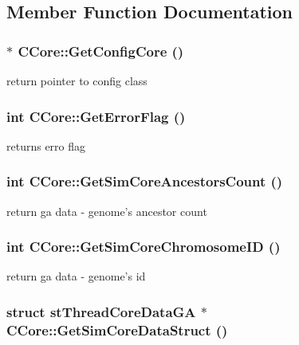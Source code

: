 \subsection{Member Function Documentation}
\hypertarget{classCCore_a08ea111ccd738ddbc2d29ec3c9ac3443}{
\subsubsection[{GetConfigCore}]{ $\ast$ CCore::GetConfigCore ()}}
\label{classCCore_a08ea111ccd738ddbc2d29ec3c9ac3443}
return pointer to config class \hypertarget{classCCore_a86ddf9496601836d1dae7432279fd044}{
\subsubsection[{GetErrorFlag}]{\setlength{\rightskip}{0pt plus 5cm}int CCore::GetErrorFlag ()}}
\label{classCCore_a86ddf9496601836d1dae7432279fd044}
returns erro flag \hypertarget{classCCore_ab1b7b2beb189d420eac4f2af40d883c2}{
\subsubsection[{GetSimCoreAncestorsCount}]{\setlength{\rightskip}{0pt plus 5cm}int CCore::GetSimCoreAncestorsCount ()}}
\label{classCCore_ab1b7b2beb189d420eac4f2af40d883c2}
return ga data -\/ genome's ancestor count \hypertarget{classCCore_acad2cd2c8de535f03515281b58c643a6}{
\subsubsection[{GetSimCoreChromosomeID}]{\setlength{\rightskip}{0pt plus 5cm}int CCore::GetSimCoreChromosomeID ()}}
\label{classCCore_acad2cd2c8de535f03515281b58c643a6}
return ga data -\/ genome's id \hypertarget{classCCore_a4ddbbc5f50ff19b2d2b9095792b648a6}{
\subsubsection[{GetSimCoreDataStruct}]{\setlength{\rightskip}{0pt plus 5cm}struct {\bf stThreadCoreDataGA} $\ast$ CCore::GetSimCoreDataStruct ()}}
